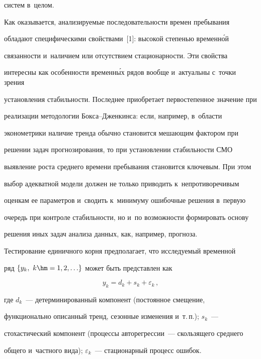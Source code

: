 сис\-тем в~целом. 


     


     Как оказывается, анализируемые последовательности времен пребывания 


обладают специфическими свойствами~[1]: высокой сте\-пенью временн\'{о}й 


свя\-зан\-ности и~наличием или отсутствием ста\-ци\-о\-нар\-ности. Эти свойства 


интересны как особенности временн\'{ы}х рядов вообще и~актуальны с~точки зрения 


установления ста\-биль\-ности. Последнее приобретает первостепенное значение при 


реализации методологии Бок\-са--Джен\-кин\-са: если, например, в~об\-ласти 


эко\-но\-мет\-ри\-ки наличие тренда обычно становится ме\-ша\-ющим фактором при 


решении задач прогнозирования, то при установлении ста\-биль\-ности СМО 


выявление роста сред\-не\-го времени пребывания становится ключевым. При этом 


выбор адекватной модели должен не только приводить к~непротиворечивым 


оценкам ее па\-ра\-мет\-ров и~сводить к~минимуму ошибочные решения в~первую 


очередь при контроле ста\-биль\-ности, но и~по воз\-мож\-ности формировать основу 


решения иных задач анализа данных, как, например, прогноза. 


     


     Тестирование единичного корня предполагает, что ис\-сле\-ду\-емый временной 


ряд $\{y_k,\ k\hm=1,2,\ldots\}$ может быть пред\-став\-лен как


     $$


     y_k=d_k+s_k+\varepsilon_k\,,


     $$


где $d_k$~--- детерминированный компонент (постоянное смещение, 


функционально описанный тренд, сезонные изменения и~т.\,п.); $s_k$~--- 


стохастический компонент (процессы авторегрессии~--- скользящего среднего 


общего и~част\-но\-го вида); $\varepsilon_k$~--- стационарный процесс ошибок. 


